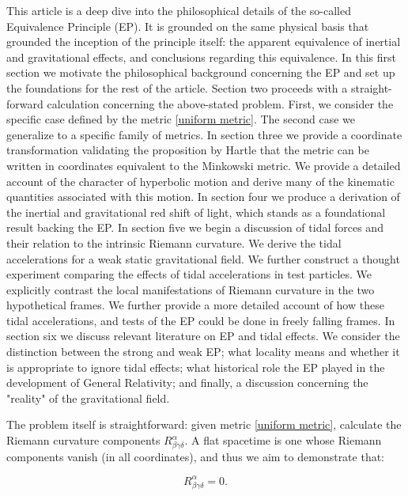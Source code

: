 \documentclass[11pt]{article}
\begin{document}
This article is a deep dive into the philosophical details of the so-called Equivalence Principle (EP). It is grounded on the same physical basis that grounded the inception of the principle itself: the apparent equivalence of inertial and gravitational effects, and conclusions regarding this equivalence. In this first section we motivate the philosophical background concerning the EP and set up the foundations for the rest of the article. Section two proceeds with a straight-forward calculation concerning the above-stated problem. First, we consider the specific case defined by the metric \eqref{uniform metric}. The second case we generalize to a specific family of metrics. In section three we provide a coordinate transformation validating the proposition by Hartle that the metric can be written in coordinates equivalent to the Minkowski metric. We provide a detailed account of the character of hyperbolic motion and derive many of the kinematic quantities associated with this motion. In section four we produce a derivation of the inertial and gravitational red shift of light, which stands as a foundational result backing the EP. In section five we begin a discussion of tidal forces and their relation to the intrinsic Riemann curvature. We derive the tidal accelerations for a weak static gravitational field. We further construct a thought experiment comparing the effects of tidal accelerations in test particles. We explicitly contrast the local manifestations of Riemann curvature in the two hypothetical frames. We further provide a more detailed account of how these tidal accelerations, and tests of the EP could be done in freely falling frames. In section six we discuss relevant literature on EP and tidal effects. We consider the distinction between the strong and weak EP; what locality means and whether it is appropriate to ignore tidal effects; what historical role the EP played in the development of General Relativity; and finally, a discussion concerning the "reality" of the gravitational field. 

The problem itself is straightforward: given metric \eqref{uniform metric}, calculate the Riemann curvature components $R^{\alpha} _{\beta \gamma \delta}$. A flat spacetime is one whose Riemann components vanish (in all coordinates), and thus we aim to demonstrate that:

\begin{equation}
    \label{flat Riemann}
    R^{\alpha} _{\beta \gamma \delta} = 0.
\end{equation}
\end{document}
